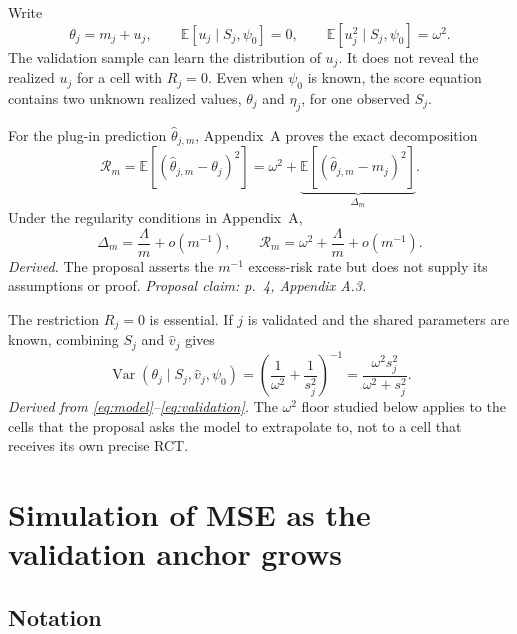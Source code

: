\documentclass[11pt]{article}
\newcommand{\E}{\mathbb E}
\newcommand{\Var}{\operatorname{Var}}
\begin{document}
Write
\begin{equation}
 \theta_j=m_j+u_j,
 \qquad
 \E[u_j\mid S_j,\psi_0]=0,
 \qquad
 \E[u_j^2\mid S_j,\psi_0]=\omega^2.
 \label{eq:residual}
\end{equation}
The validation sample can learn the distribution of \(u_j\). It does not
reveal the realized \(u_j\) for a cell with \(R_j=0\). Even when
\(\psi_0\) is known, the score equation contains two unknown realized values,
\(\theta_j\) and \(\eta_j\), for one observed \(S_j\).

For the plug-in prediction \(\widehat\theta_{j,m}\), Appendix~A proves the
exact decomposition
\begin{equation}
 \mathcal R_m
 =\E[(\widehat\theta_{j,m}-\theta_j)^2]
 =\omega^2+
 \underbrace{\E[(\widehat\theta_{j,m}-m_j)^2]}_{\Delta_m}.
 \label{eq:main-decomposition}
\end{equation}
Under the regularity conditions in Appendix~A,
\begin{equation}
 \Delta_m=\frac{\Lambda}{m}+o(m^{-1}),
 \qquad
 \mathcal R_m=\omega^2+\frac{\Lambda}{m}+o(m^{-1}).
 \label{eq:main-expansion}
\end{equation}
\emph{Derived.} The proposal asserts the \(m^{-1}\) excess-risk rate but
does not supply its assumptions or proof. \emph{Proposal claim: p.~4,
Appendix A.3.}

The restriction \(R_j=0\) is essential. If \(j\) is validated and the shared
parameters are known, combining \(S_j\) and \(\widehat v_j\) gives
\begin{equation}
 \Var(\theta_j\mid S_j,\widehat v_j,\psi_0)
 =\left(\frac1{\omega^2}+\frac1{s_j^2}\right)^{-1}
 =\frac{\omega^2s_j^2}{\omega^2+s_j^2}.
 \label{eq:validated-variance}
\end{equation}
\emph{Derived from \eqref{eq:model}--\eqref{eq:validation}.} The
\(\omega^2\) floor studied below applies to the cells that the proposal asks
the model to extrapolate to, not to a cell that receives its own precise RCT.

\section{Simulation of MSE as the validation anchor grows}

\subsection*{Notation}
\end{document}
